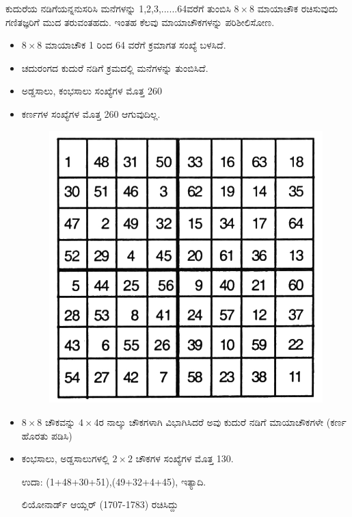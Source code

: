 ಕುದುರೆಯ ನಡಿಗೆಯನ್ನನುಸರಿಸಿ ಮನೆಗಳನ್ನು 1,2,3,......64ವರೆಗೆ ತುಂಬಿಸಿ $8 \times 8$ ಮಾಯಾಚೌಕ ರಚಿಸುವುದು ಗಣಿತಜ್ಞರಿಗೆ ಮುದ ತರುವಂತಹದು. ಇಂತಹ ಕೆಲವು ಮಾಯಾಚೌಕಗಳನ್ನು ಪರಿಶೀಲಿಸೋಣ.
\begin{itemize}
	\item $8 \times 8$ ಮಾಯಾಚೌಕ 1 ರಿಂದ 64 ವರೆಗೆ ಕ್ರಮಾಗತ ಸಂಖ್ಯೆ ಬಳಸಿದೆ.
	\item ಚದುರಂಗದ ಕುದುರೆ ನಡಿಗೆ ಕ್ರಮದಲ್ಲಿ ಮನೆಗಳನ್ನು ತುಂಬಿಸಿದೆ.
	\item ಅಡ್ಡಸಾಲು, ಕಂಭಸಾಲು ಸಂಖ್ಯೆಗಳ ಮೊತ್ತ 260
	\item ಕರ್ಣಗಳ ಸಂಖ್ಯೆಗಳ ಮೊತ್ತ 260 ಆಗುವುದಿಲ್ಲ.
	\begin{figure}[H]
	\includegraphics[scale=1.3]{src/figures/chap6/fig6-3.jpg}
	\end{figure}
	\item $8 \times 8$ ಚೌಕವನ್ನು $4 \times 4$ರ ನಾಲ್ಕು ಚೌಕಗಳಾಗಿ ವಿಭಾಗಿಸಿದರೆ ಅವು ಕುದುರೆ ನಡಿಗೆ ಮಾಯಾಚೌಕಗಳೇ (ಕರ್ಣ ಹೊರತು ಪಡಿಸಿ)
	\item ಕಂಭಸಾಲು, ಅಡ್ಡಸಾಲುಗಳಲ್ಲಿ $2 \times 2$ ಚೌಕಗಳ ಸಂಖ್ಯೆಗಳ ಮೊತ್ತ 130.

	ಉದಾ: (1+48+30+51),(49+32+4+45), ಇತ್ಯಾದಿ.

	ಲಿಯೋನಾರ್ಡ್ ಆಯ್ಲರ್ (1707-1783) ರಚಿಸಿದ್ದು
\end{itemize}

